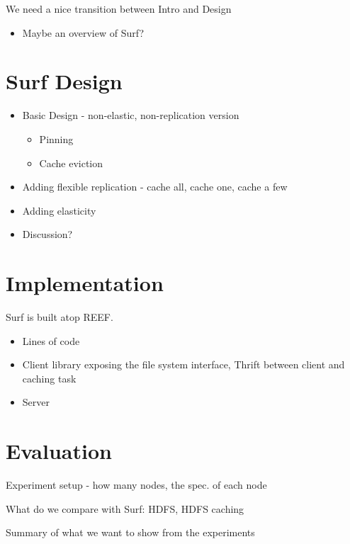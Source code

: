 \documentclass[twocolumn,10pt]{article}
\begin{document}
\noindent We need a nice transition between Intro and Design

\begin{itemize}
\item Maybe an overview of Surf?
\end{itemize}

\section{Surf Design}

\begin{itemize}
\item Basic Design - non-elastic, non-replication version
\begin{itemize}
\item Pinning
\item Cache eviction
\end{itemize}
\item Adding flexible replication - cache all, cache one, cache a few 
\item Adding elasticity
\item Discussion?
\end{itemize}


\section{Implementation}

Surf is built atop REEF\cite{reef}.

\begin{itemize}
\item Lines of code
\item Client library exposing the file system interface, Thrift between client and caching task
\item Server
\end{itemize}

\section{Evaluation}

\noindent Experiment setup - how many nodes, the spec. of each node

\noindent What do we compare with Surf: HDFS, HDFS caching

\noindent Summary of what we want to show from the experiments
\end{document}
